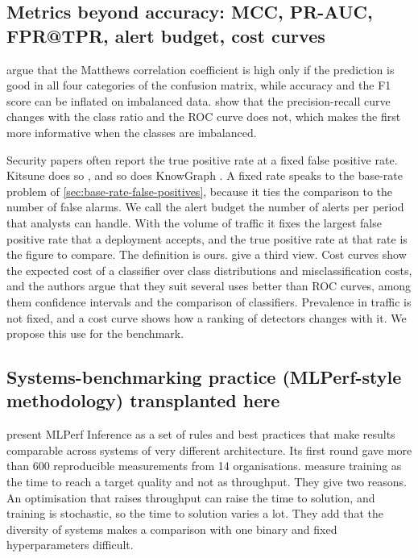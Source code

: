 \subsection{Metrics beyond accuracy: MCC, PR-AUC, FPR@TPR, alert budget, cost curves}
\label{sec:metrics-beyond-accuracy}

\citet{chicco2020mcc} argue that the Matthews correlation coefficient is high
only if the prediction is good in all four categories of the confusion matrix,
while accuracy and the F1 score can be inflated on imbalanced data.
\citet{saito2015precision} show that the precision-recall curve changes with the
class ratio and the ROC curve does not, which makes the first more informative
when the classes are imbalanced.

Security papers often report the true positive rate at a fixed false positive
rate. Kitsune does so \citep{mirsky2018kitsune}, and so does KnowGraph
\citep{zhou2024knowgraph}. A fixed rate speaks to the base-rate problem of
\cref{sec:base-rate-false-positives}, because it ties the comparison to the
number of false alarms. We call the alert budget
the number of alerts per period that analysts can handle. With the volume of
traffic it fixes the largest false positive rate that a deployment accepts, and
the true positive rate at that rate is the figure to compare. The definition
is ours. \citet{drummond2006cost} give a third view. Cost curves show the
expected cost of a classifier over class distributions and misclassification
costs, and the authors argue that they suit several uses better than ROC
curves, among them confidence intervals and the comparison of classifiers.
Prevalence in traffic is not fixed, and a cost curve shows how a ranking of
detectors changes with it. We propose this use for the benchmark.

\subsection{Systems-benchmarking practice (MLPerf-style methodology) transplanted here}
\label{sec:mlperf-practice}

\citet{reddi2020mlperf} present MLPerf Inference as a set of rules and best
practices that make results comparable across systems of very different
architecture. Its first round gave more than 600 reproducible measurements from
14 organisations. \citet{mattson2020mlperf} measure training as the time to
reach a target quality and not as throughput. They give two reasons. An
optimisation that raises throughput can raise the time to solution, and
training is stochastic, so the time to solution varies a lot. They add that
the diversity of systems makes a comparison with one binary and fixed
hyperparameters difficult.

